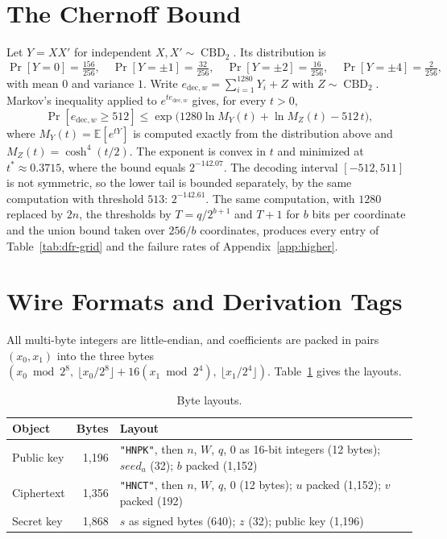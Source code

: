 \documentclass[11pt,a4paper]{article}
\theoremstyle{definition}
\newcommand{\CBD}{\operatorname{CBD}}
\begin{document}



\appendix

\section{The Chernoff Bound}\label{app:chernoff}
Let $Y = XX'$ for independent $X, X' \sim \CBD_2$. Its distribution is
\[
\Pr[Y = 0] = \tfrac{156}{256}, \quad \Pr[Y = \pm 1] = \tfrac{32}{256}, \quad \Pr[Y = \pm 2] = \tfrac{16}{256}, \quad \Pr[Y = \pm 4] = \tfrac{2}{256},
\]
with mean $0$ and variance $1$. Write $e_{\mathrm{dec},w} = \sum_{i=1}^{1280} Y_i + Z$ with $Z \sim \CBD_2$. Markov's inequality applied to $e^{t e_{\mathrm{dec},w}}$ gives, for every $t > 0$,
\[
\Pr[e_{\mathrm{dec},w} \ge 512] \le \exp\bigl(1280 \ln M_Y(t) + \ln M_Z(t) - 512\,t\bigr),
\]
where $M_Y(t) = \mathbb{E}[e^{tY}]$ is computed exactly from the distribution above and $M_Z(t) = \cosh^4(t/2)$. The exponent is convex in $t$ and minimized at $t^{*} \approx 0.3715$, where the bound equals $2^{-142.07}$. The decoding interval $[-512, 511]$ is not symmetric, so the lower tail is bounded separately, by the same computation with threshold $513$: $2^{-142.61}$. The same computation, with $1280$ replaced by $2n$, the thresholds by $T = q/2^{b+1}$ and $T + 1$ for $b$ bits per coordinate and the union bound taken over $256/b$ coordinates, produces every entry of Table~\ref{tab:dfr-grid} and the failure rates of Appendix~\ref{app:higher}.

\section{Wire Formats and Derivation Tags}\label{app:wire}
All multi-byte integers are little-endian, and coefficients are packed in pairs $(x_0, x_1)$ into the three bytes $(x_0 \bmod 2^8,\ \lfloor x_0/2^8 \rfloor + 16 (x_1 \bmod 2^4),\ \lfloor x_1/2^4 \rfloor)$. Table~\ref{tab:wire} gives the layouts.

\begin{table}[H]
\centering
\small
\begin{tabularx}{\textwidth}{lrX}
\toprule
Object & Bytes & Layout \\
\midrule
Public key & 1{,}196 & \texttt{"HNPK"}, then $n$, $W$, $q$, $0$ as 16-bit integers (12 bytes); $\mathit{seed}_a$ (32); $b$ packed (1{,}152) \\
Ciphertext & 1{,}356 & \texttt{"HNCT"}, then $n$, $W$, $q$, $0$ (12 bytes); $u$ packed (1{,}152); $v$ packed (192) \\
Secret key & 1{,}868 & $s$ as signed bytes (640); $z$ (32); public key (1{,}196) \\
\bottomrule
\end{tabularx}
\caption{Byte layouts.}
\label{tab:wire}
\end{table}
\end{document}
